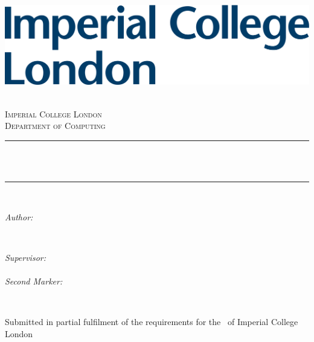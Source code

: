 \begin{titlepage}

\newcommand{\HRule}{\rule{\linewidth}{0.5mm}}
\includegraphics[width=0.5\linewidth]{figures/imperial.png}
\bigskip \bigskip
\center %

\textsc{\LARGE \reporttype}\\[1.5cm]
\textsc{\Large Imperial College London}\\[0.5cm]
\textsc{\large Department of Computing}\\[0.5cm]

\makeatletter
\HRule \\[0.1cm]
{ \huge \bfseries \@title}\\%
\HRule \\[1.5cm]

\begin{minipage}{0.4\textwidth}
\begin{flushleft} \large
\emph{Author:}\\
\@author %
\end{flushleft}
\end{minipage}
~
\begin{minipage}{0.4\textwidth}
\begin{flushright} \large
\emph{Supervisor:} \\
\supervisor \\
\emph{Second Marker:} \\
\secondmarker
\end{flushright}
\end{minipage}\\[2cm]
\makeatother



\vfill %
Submitted in partial fulfilment of the requirements for the \degreetype ~of Imperial College London
    
\end{titlepage}